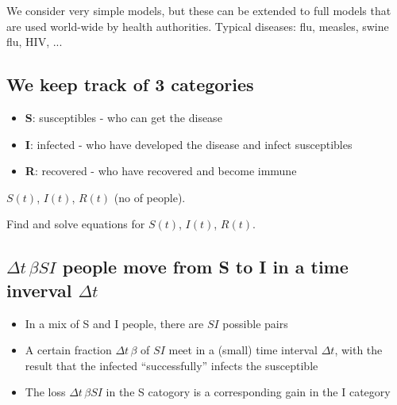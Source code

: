 \documentclass[%
twoside,                 %
final,                   %
10pt]{article}
\newenvironment{block_mdfboxadmon}[1][]{
\begin{block_mdfboxmdframed}[frametitle=#1]
}
{
\end{block_mdfboxmdframed}
}
\begin{document}
We consider very simple models, but these can be extended to full
models that are used world-wide by health authorities. Typical
diseases: flu, measles, swine flu, HIV, ...

\subsection{We keep track of 3 categories}


\begin{block_mdfboxadmon}
\begin{itemize}
 \item \textbf{S}: susceptibles - who can get the disease

 \item \textbf{I}: infected - who have developed the disease and infect susceptibles

 \item \textbf{R}: recovered - who have recovered and become immune
\end{itemize}

\noindent
\end{block_mdfboxadmon}




\begin{block_mdfboxadmon}
$S(t)$, $I(t)$, $R(t)$ (no of people).
\end{block_mdfboxadmon}




\begin{block_mdfboxadmon}[Goal:]
Find and solve equations for $S(t)$, $I(t)$, $R(t)$.
\end{block_mdfboxadmon}



\subsection{$\Delta t\,\beta SI$ people move from S to I in a time inverval $\Delta t$}


\begin{block_mdfboxadmon}[S-I interaction:]
\begin{itemize}
  \item In a mix of S and I people, there are $SI$ possible pairs

  \item A certain fraction $\Delta t\,\beta$ of $SI$ meet in a (small)
    time interval $\Delta t$, with the result that the infected
    ``successfully'' infects the susceptible

  \item The loss $\Delta t\,\beta SI$ in the S catogory is a corresponding
    gain in the I category
\end{itemize}

\noindent
\end{block_mdfboxadmon}
\end{document}
